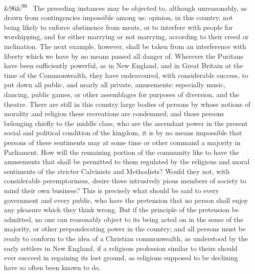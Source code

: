 \documentclass[12pt]{article}
\newcommand{\para}[1][]{\par\noindent\ifx&#1&\else\textsuperscript{\footnotesize #1}~\fi}
\begin{document}
\para[96] The preceding instances may be objected to, although unreasonably, as drawn from contingencies impossible among us: opinion, in this country, not being likely to enforce abstinence from meats, or to interfere with people for worshipping, and for either marrying or not marrying, according to their creed or inclination. The next example, however, shall be taken from an interference with liberty which we have by no means passed all danger of. Wherever the Puritans have been sufficiently powerful, as in New England, and in Great Britain at the time of the Commonwealth, they have endeavoured, with considerable success, to put down all public, and nearly all private, amusements: especially music, dancing, public games, or other assemblages for purposes of diversion, and the theatre. There are still in this country large bodies of persons by whose notions of morality and religion these recreations are condemned; and those persons belonging chiefly to the middle class, who are the ascendant power in the present social and political condition of the kingdom, it is by no means impossible that persons of these sentiments may at some time or other command a majority in Parliament. How will the remaining portion of the community like to have the amusements that shall be permitted to them regulated by the religious and moral sentiments of the stricter Calvinists and Methodists? Would they not, with considerable peremptoriness, desire these intrusively pious members of society to mind their own business? This is precisely what should be said to every government and every public, who have the pretension that no person shall enjoy any pleasure which they think wrong. But if the principle of the pretension be admitted, no one can reasonably object to its being acted on in the sense of the majority, or other preponderating power in the country; and all persons must be ready to conform to the idea of a Christian commonwealth, as understood by the early settlers in New England, if a religious profession similar to theirs should ever succeed in regaining its lost ground, as religions supposed to be declining have so often been known to do.
\end{document}
